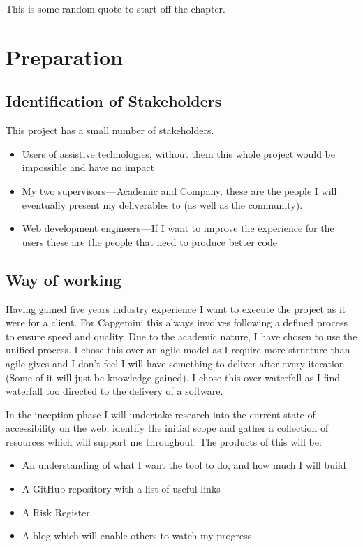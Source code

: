 \begin{savequote}[75mm]
This is some random quote to start off the chapter.
\end{savequote}

\chapter{Preparation}

\section{Identification of Stakeholders}
This project has a small number of stakeholders.
\begin{itemize}
  \item Users of assistive technologies, without them this whole project would be impossible and have no impact
  \item My two supervisors — Academic and Company, these are the people I will eventually present my deliverables to (as well as the
  community).
  \item Web development engineers — If I want to improve the experience for the users these are the people that need to produce better code
\end{itemize}

\section{Way of working}
Having gained five years industry experience I want to execute the project as it were for a client. For Capgemini this always involves
following a defined process to ensure speed and quality. Due to the academic nature, I have chosen to use the unified process. I chose this
over an agile model as I require more structure than agile gives and I don't feel I will have something to deliver after every iteration
(Some of it will just be knowledge gained). I chose this over waterfall as I find waterfall too directed to the delivery of a software.


In the inception phase I will undertake research into the current state of accessibility on the web, identify the initial scope and gather
a collection of resources which will support me throughout. The products of this will be:
\begin{itemize}
  \item An understanding of what I want the tool to do, and how much I will build
  \item A GitHub repository with a list of useful links
  \item A Risk Register
  \item A blog which will enable others to watch my progress
\end{itemize}

